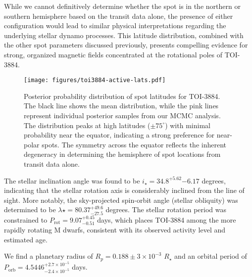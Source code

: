 \documentclass[twocolumn]{aastex631}
\begin{document}
While we cannot definitively determine whether the spot is in the northern or southern hemisphere based on the transit data alone, 
the presence of either configuration would lead to similar physical interpretations regarding the underlying stellar dynamo processes. 
This latitude distribution, combined with the other spot parameters discussed previously, presents compelling evidence for strong, 
organized magnetic fields concentrated at the rotational poles of TOI-3884.
%
\begin{figure*}[hbt!]
    \centering
    \texttt{[image: figures/toi3884-active-lats.pdf]}
    \caption{Posterior probability distribution of spot latitudes for TOI-3884. The black line shows the mean distribution, 
    while the pink lines represent individual posterior samples from our MCMC analysis. The distribution peaks at high latitudes 
    ($\pm75^{\circ}$) with minimal probability near the equator, indicating a strong preference for near-polar spots.
    The symmetry across 
    the equator reflects the inherent degeneracy in determining the hemisphere of spot locations from transit data alone.}
    \label{fig:spot_latitudes}
\end{figure*}
%

The stellar inclination angle was found to be $i_\star = {34.8}^{+5.62}{-6.17}$ degrees, indicating that the stellar rotation 
axis is considerably inclined from the line of sight. More notably, the sky-projected spin-orbit angle (stellar obliquity) was 
determined to be $\lambda\star = {80.37}^{+49.6}_{-27.5}$ degrees.
The stellar rotation period was constrained to $P_\text{rot} = 9.07^{+0.45}_{-0.51}$ days, which places TOI-3884 among the 
more rapidly rotating M dwarfs, consistent with its observed activity level and estimated age.

We find a planetary radius of $R_p = 0.188 \pm 3\times10^{-3}$ $R_\star$ and an orbital period of 
$P_\text{orb} = 4.5446^{+2.7\times10^{-5}}_{-2.4\times10^{-5}}$ days. 
\end{document}
